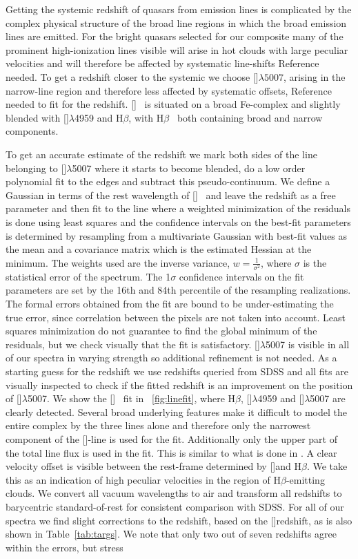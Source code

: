 \documentclass{aa}    %
\newcommand{\figref}[1]{\ref{fig:#1}}
\newcommand{\Fig}[1]{\figurename~\figref{#1}}
\newcommand{\fig}[1]{\Fig{#1}}
\newcommand{\Tab}[1]{Table~\ref{tab:#1}}
\newcommand{\tab}[1]{\Tab{#1}}
\newcommand{\hb}{H$\beta$}
\newcommand{\oiii}{[\ion{O}{iii}]}
\begin{document}
Getting the systemic redshift of quasars from emission lines is complicated by the complex physical structure of the broad line regions in which the broad emission lines are emitted. For the bright quasars selected for our composite many of the prominent high-ionization lines visible will arise in hot clouds with large peculiar velocities and will therefore be affected by systematic line-shifts {\color{red} Reference needed}. To get a redshift closer to the systemic we choose \oiii$\lambda5007$,  arising in the narrow-line region and therefore less affected by systematic offsets, {\color{red} Reference needed} to fit for the redshift. \oiii~ is situated on a broad Fe-complex and slightly blended with \oiii$\lambda$4959 and \hb, with \hb~ both containing broad and narrow components. 

To get an accurate estimate of the redshift we mark both sides of the line belonging to \oiii$\lambda$5007 where it starts to become blended, do a low order polynomial fit to the edges and subtract this pseudo-continuum. We define a Gaussian in terms of the rest wavelength of \oiii~ and leave the redshift as a free parameter and then fit to the line where a weighted minimization of the residuals is done using least squares and the confidence intervals on the best-fit parameters is determined by resampling from a multivariate Gaussian with best-fit values as the mean and a covariance matrix which is the estimated Hessian at the minimum. The weights used are the inverse variance, $ w =  \frac{1}{\sigma^2}$, where $\sigma$ is the statistical error of the spectrum. The 1$\sigma$ confidence intervals on the fit parameters are set by the 16th and 84th percentile of the resampling realizations. The formal errors obtained from the fit are bound to be under-estimating the true error, since correlation between the pixels are not taken into account. Least squares minimization do not guarantee to find the global minimum of the residuals, but we check visually that the fit is satisfactory. \oiii$\lambda$5007 is visible in all of our spectra in varying strength so additional refinement is not needed. As a starting guess for the redshift we use redshifts queried from SDSS and all fits are visually inspected to check if the fitted redshift is an improvement on the position of \oiii$\lambda$5007. We show the \oiii~ fit in \fig{linefit}, where \hb, \oiii$\lambda$4959 and \oiii$\lambda$5007 are clearly detected. Several broad underlying features make it difficult to model the entire complex by the three lines alone and therefore only the narrowest component of the \oiii-line is used for the fit. Additionally only the upper part of the total line flux is used in the fit. This is similar to what is done in \citep{VandenBerk2001}. A clear velocity offset is visible between the rest-frame determined by \oiii and \hb. We take this as an indication of high peculiar velocities in the region of \hb-emitting clouds. We convert all vacuum wavelengths to air and transform all redshifts to barycentric standard-of-rest for consistent comparison with SDSS. For all of our spectra we find slight corrections to the redshift, based on the \oiii redshift, as is also shown in \tab{targs}. We note that only two out of seven redshifts agree within the errors, but stress 
\end{document}
